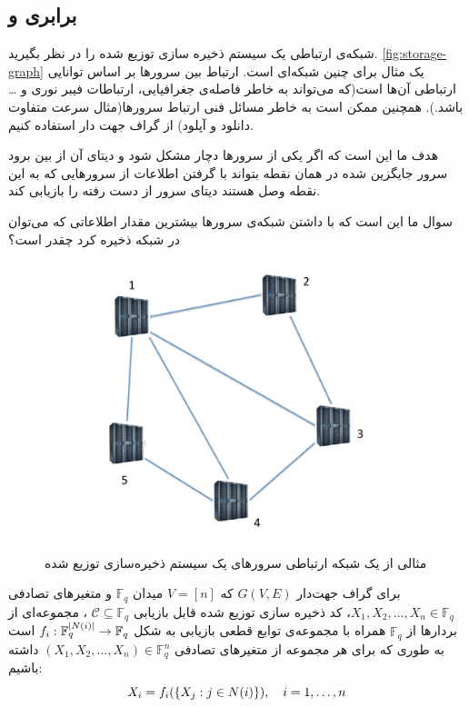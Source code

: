  \subsection{
 برابری 
 \icod
 و
 \SFRDSS
 }
\label{subsec:arya}
 شبکه‌ی ارتباطی یک سیستم ذخیره سازی توزیع شده را در نظر بگیرید.
 \autoref{fig:storage-graph}
 یک مثال برای چنین شبکه‌ای است. ارتباط بین سرورها بر اساس توانایی ارتباطی آن‌ها است(که می‌تواند به خاطر فاصله‌ی جغرافیایی، ارتباطات فیبر نوری و \ldots باشد.). همچنین ممکن است به خاطر مسائل فنی ارتباط سرورها(مثال سرعت متفاوت دانلود و آپلود) از گراف جهت دار استفاده کنیم.
 
 هدف ما این است که اگر یکی از سرورها دچار مشکل شود و دیتای آن از بین برود سرور جایگزین شده در همان نقطه بتواند با گرفتن اطلاعات از سرورهایی که به این نقطه وصل هستند دیتای سرور از دست رفته را بازیابی کند.
 
 سوال ما این است که با داشتن شبکه‌ی سرورها بیشترین مقدار اطلاعاتی که می‌توان در شبکه ذخیره کرد چقدر است؟
\begin{figure}[H]
	\centering
	\includegraphics[width=0.5\linewidth]{figs/chapter6/storage-graph}
	\caption[
	مثالی از یک شبکه ارتباطی سرورهای یک سیستم ذخیره‌سازی توزیع شده]{
		مثالی از یک شبکه ارتباطی سرورهای یک سیستم ذخیره‌سازی توزیع شده
		\cite{arya}
		}
	\label{fig:storage-graph}
\end{figure}

\begin{definition}
	برای گراف جهت‌دار
	$G(V, E)$
	که
	$V = [n]$
	میدان
	$\mathbb{F}_{q}$
	و متغیرهای تصادفی
	$X_1, X_2, \ldots, X_n \in \mathbb{F}_{q}$،
		کد ذخیره سازی توزیع شده قابل بازیابی 
		$\mathcal{C} \subseteq \mathbb{F}_{q}$
		،  مجموعه‌ای از بردار‌ها از
		$\mathbb{F}_{q}$
		همراه با مجموعه‌ی توابع قطعی بازیابی به شکل
		$f_i: \mathbb{F}_q^{\left|{N(i)}\right|} \to \mathbb{F}_q$
		است به طوری که برای هر مجموعه از متغیرهای تصادفی 
		$(X_1, X_2,\dots,X_n) \in \mathbb{F}_q^n$
		داشته باشیم:
		$$X_i = f_i(\left\{ X_j: j \in N(i) \right\}), \quad i = 1,\dots,n$$
\end{definition}


